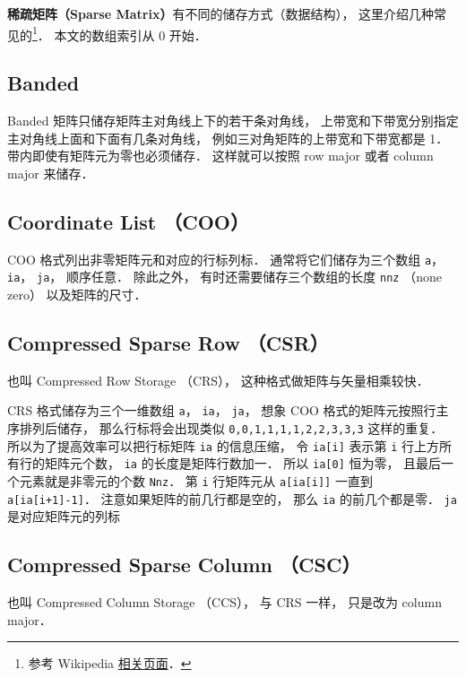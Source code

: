 
\textbf{稀疏矩阵（Sparse Matrix）}有不同的储存方式（数据结构）， 这里介绍几种常见的\footnote{参考 Wikipedia \href{https://en.wikipedia.org/wiki/Sparse_matrix}{相关页面}．}． 本文的数组索引从 0 开始．

\subsection{Banded}
Banded 矩阵只储存矩阵主对角线上下的若干条对角线， 上带宽和下带宽分别指定主对角线上面和下面有几条对角线， 例如三对角矩阵的上带宽和下带宽都是 1． 带内即使有矩阵元为零也必须储存． 这样就可以按照 row major 或者 column major 来储存．

\subsection{Coordinate List （COO）}
COO 格式列出非零矩阵元和对应的行标列标． 通常将它们储存为三个数组 \verb|a|， \verb|ia|， \verb|ja|， 顺序任意． 除此之外， 有时还需要储存三个数组的长度 \verb|nnz| （none zero） 以及矩阵的尺寸．

\subsection{Compressed Sparse Row （CSR）}
也叫 Compressed Row Storage （CRS）， 这种格式做矩阵与矢量相乘较快．

CRS 格式储存为三个一维数组 \verb|a|， \verb|ia|， \verb|ja|， 想象 COO 格式的矩阵元按照行主序排列后储存， 那么行标将会出现类似 \verb|0,0,1,1,1,1,2,2,3,3,3| 这样的重复． 所以为了提高效率可以把行标矩阵 \verb|ia| 的信息压缩， 令 \verb|ia[i]| 表示第 \verb|i| 行上方所有行的矩阵元个数， \verb|ia| 的长度是矩阵行数加一． 所以 \verb|ia[0]| 恒为零， 且最后一个元素就是非零元的个数 \verb|Nnz|． 第 \verb|i| 行矩阵元从 \verb|a[ia[i]]| 一直到 \verb|a[ia[i+1]-1]|． 注意如果矩阵的前几行都是空的， 那么 \verb|ia| 的前几个都是零． \verb|ja| 是对应矩阵元的列标

\subsection{Compressed Sparse Column （CSC）}
也叫 Compressed Column Storage （CCS）， 与 CRS 一样， 只是改为 column major．

